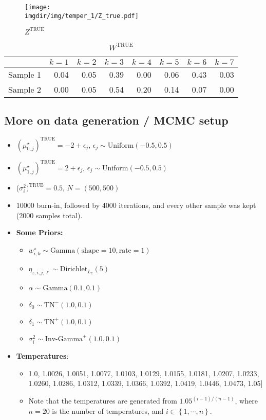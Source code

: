 \documentclass[10pt]{article} %
\newcommand{\bc}[1]{ \left\{#1\right\} }
\newcommand{\Gam}{ \text{Gamma} }
\newcommand{\InvGamma}{ \text{Inv-Gamma} }
\newcommand{\Uniform}{ \text{Uniform} }
\def\Dir{\text{Dirichlet}}
\def\TN{\text{TN}}
\def\true{\text{TRUE}}
\def\imgdir{../../results/test-sim-6-7-5/maxtemp1.05-ntemps20-degree1-N2000}
\begin{document}
\begin{figure}[H]
  \begin{center}  %
    \texttt{[image: \\imgdir/img/temper\_1/Z\_true.pdf]}
  \end{center}
  \caption{$Z^\true$}
  \label{fig:Z-true}
\end{figure}

\begin{table}[ht]
  \centering
  \begin{tabular}{rrrrrrrr}
    \hline
    & $k=1$ & $k=2$ & $k=3$ & $k=4$ & $k=5$ & $k=6$ & $k=7$ \\
    \hline
    Sample 1 & 0.04 & 0.05 & 0.39 & 0.00 & 0.06 & 0.43 & 0.03 \\
    Sample 2 & 0.00 & 0.05 & 0.54 & 0.20 & 0.14 & 0.07 & 0.00 \\
    \hline
  \end{tabular}
  \caption{$W^\true$}
  \label{tab:W-true}
\end{table}

\subsection{More on data generation / MCMC setup}
\begin{itemize}
  \item $(\mu_{0,j}^\star)^\true=-2 + \epsilon_j$, $\epsilon_j \sim \Uniform(-0.5, 0.5)$
  \item $(\mu_{1,j}^\star)^\true=2 + \epsilon_j$, $\epsilon_j \sim \Uniform(-0.5, 0.5)$
  \item ($\sigma^2_i)^\true=0.5$, $N=(500, 500)$
  \item 10000 burn-in, followed by 4000 iterations, and every other sample was
    kept (2000 samples total).
  \item \textbf{Some Priors:}
  \begin{itemize}
    \item $w^\star_{i,k} \sim \Gam(\text{shape}=10, \text{rate}=1)$
    \item $\eta_{z, i,j,\ell} \sim \Dir_{L_z}(5)$
    \item $\alpha \sim \Gam(0.1, 0.1)$
    \item $\delta_0 \sim \TN^-(1.0, 0.1)$
    \item $\delta_1 \sim \TN^+(1.0, 0.1)$
    \item $\sigma^2_i \sim \InvGamma^+(1.0, 0.1)$
  \end{itemize}
\item \textbf{Temperatures}: 
    \begin{itemize}
      \item 
        1.0, 1.0026, 1.0051, 1.0077,
        1.0103, 1.0129, 1.0155,
        1.0181, 1.0207, 1.0233,
        1.0260, 1.0286, 1.0312,
        1.0339, 1.0366, 1.0392,
        1.0419, 1.0446, 1.0473, 1.05]
      \item Note that the temperatures are generated from $1.05^{(i - 1) / (n -
        1)}$, where $n=20$ is the number of temperatures, and
        $i\in\bc{1,\cdots,n}$.
    \end{itemize}
\end{itemize}
\end{document}
